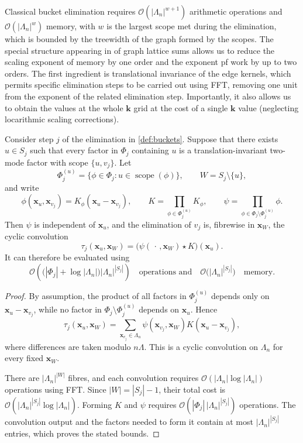 \documentclass[]{amsart}
\numberwithin{mythm}{section}
\begin{document}
Classical bucket elimination requires $\mathcal O(|\Lambda_n|^{w+1})$ arithmetic operations and $\mathcal O(|\Lambda_n|^{w})$ memory, with $w$ is the largest scope met during the elimination, which is bounded by the treewidth of the graph formed by the scopes. The special structure appearing in of graph lattice sums allows us to reduce the scaling exponent of memory by one order and the exponent pf work by up to two orders. The first ingredient is translational invariance of the edge kernels, which permits specific elimination steps to be carried out using FFT, removing one unit from the exponent of the related elimination step. Importantly, it also allows us to obtain the values at the whole $\bm k$ grid at the cost of a single $\bm k$ value (neglecting locarithmic scaling corrections).

\begin{lemma}
\label{lem:peeling}
Consider step \(j\) of the elimination in \cref{def:buckets}. Suppose that
there exists \(u\in S_j\) such that every factor in \(\Phi_j\) containing
\(u\) is a translation-invariant two-mode factor with scope
\(\{u,v_j\}\). Let
\[
    \Phi_j^{(u)}
    =
    \bigl\{
        \phi\in\Phi_j:
        u\in\operatorname{scope}(\phi)
    \bigr\},
    \qquad
    W
    =
    S_j\setminus\{u\},
\]
and write
\[
    \phi(\bm x_u,\bm x_{v_j})
    =
    K_\phi(\bm x_u-\bm x_{v_j}),
    \qquad
    K
    =
    \prod_{\phi\in\Phi_j^{(u)}}K_\phi,
    \qquad
    \psi
    =
    \prod_{\phi\in\Phi_j\setminus\Phi_j^{(u)}}\phi.
\]
Then \(\psi\) is independent of \(\bm x_u\), and the elimination of \(v_j\)
is, fibrewise in \(\bm x_W\), the cyclic convolution
\[
    \tau_j(\bm x_u,\bm x_W)
    =
    \bigl(\psi(\,\cdot\,,\bm x_W)\star K\bigr)(\bm x_u).
\]
It can therefore be evaluated using
\[
    \mathcal O\!\left(
        \bigl(|\Phi_j|+\log|\Lambda_n|\bigr)
        |\Lambda_n|^{|S_j|}
    \right)
    \quad\text{operations and}\quad
    \mathcal O\bigl(
        |\Lambda_n|^{|S_j|}
    \bigr)
    \quad\text{memory}.
\]
\end{lemma}

\begin{proof}
By assumption, the product of all factors in \(\Phi_j^{(u)}\) depends only
on \(\bm x_u-\bm x_{v_j}\), while no factor in
\(\Phi_j\setminus\Phi_j^{(u)}\) depends on \(\bm x_u\). Hence
\[
    \tau_j(\bm x_u,\bm x_W)
    =
    \sum_{\bm x_{v_j}\in\Lambda_n}
    \psi(\bm x_{v_j},\bm x_W)
    K(\bm x_u-\bm x_{v_j}),
\]
where differences are taken modulo \(n\Lambda\). This is a cyclic
convolution on \(\Lambda_n\) for every fixed \(\bm x_W\).

There are \(|\Lambda_n|^{|W|}\) fibres, and each convolution requires
\(\mathcal O(|\Lambda_n|\log|\Lambda_n|)\) operations using FFT.
Since \(|W|=|S_j|-1\), their total cost is
\(\mathcal O(|\Lambda_n|^{|S_j|}\log|\Lambda_n|)\). Forming \(K\) and
\(\psi\) requires
\(\mathcal O(|\Phi_j|\,|\Lambda_n|^{|S_j|})\) operations. The convolution
output and the factors needed to form it contain at most
\(|\Lambda_n|^{|S_j|}\) entries, which proves the stated bounds.
\end{proof}
\end{document}
